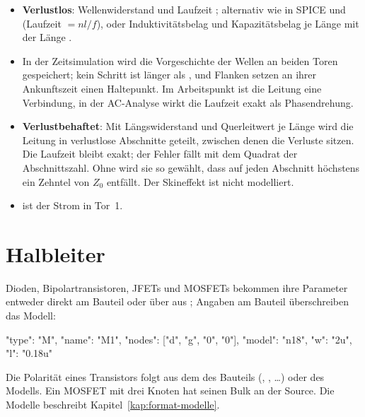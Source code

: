 \begin{itemize}
  \item \textbf{Verlustlos}: Wellenwiderstand  und Laufzeit
    ; alternativ wie in SPICE  und  (Laufzeit
    $= \mathit{nl}/f$), oder Induktivitätsbelag  und
    Kapazitätsbelag  je Länge mit der Länge .
  \item In der Zeitsimulation wird die Vorgeschichte der Wellen an beiden
    Toren gespeichert; kein Schritt ist länger als , und Flanken
    setzen an ihrer Ankunftszeit einen Haltepunkt. Im Arbeitspunkt ist die
    Leitung eine Verbindung, in der AC-Analyse wirkt die Laufzeit exakt als
    Phasendrehung.
  \item \textbf{Verlustbehaftet}: Mit Längswiderstand  und
    Querleitwert  je Länge wird die Leitung in verlustlose
    Abschnitte geteilt, zwischen denen die Verluste sitzen. Die Laufzeit
    bleibt exakt; der Fehler fällt mit dem Quadrat der Abschnittszahl. Ohne
     wird sie so gewählt, dass auf jeden Abschnitt höchstens
    ein Zehntel von $Z_0$ entfällt. Der Skineffekt ist nicht modelliert.
  \item {} ist der Strom in Tor~1.
\end{itemize}

\section{Halbleiter}

Dioden, Bipolartransistoren, JFETs und MOSFETs bekommen ihre Parameter
entweder direkt am Bauteil oder über  aus
; Angaben am Bauteil überschreiben das Modell:

\begin{json}
{ "type": "M", "name": "M1", "nodes": ["d", "g", "0", "0"], "model": "n18",
  "w": "2u", "l": "0.18u" }
\end{json}

Die Polarität eines Transistors folgt aus dem  des Bauteils
(, , \dots) oder des Modells. Ein MOSFET mit drei Knoten
hat seinen Bulk an der Source. Die Modelle beschreibt
Kapitel~\ref{kap:format-modelle}.
